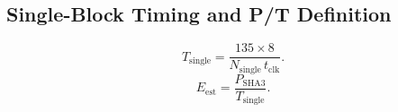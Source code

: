 \subsection{Single-Block Timing and P/T Definition}
\begin{equation}
T_{\mathrm{single}} =
\frac{135 \times 8}{N_{\mathrm{single}}\,t_{\mathrm{clk}}}.
\label{eq:single-throughput}
\end{equation}
\begin{equation}
E_{\mathrm{est}} =
\frac{P_{\mathrm{SHA3}}}{T_{\mathrm{single}}}.
\label{eq:estimated-energy}
\end{equation}

